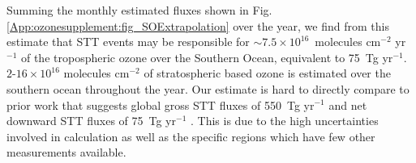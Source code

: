   Summing the monthly estimated fluxes shown in Fig. \ref{App:ozonesupplement:fig_SOExtrapolation} over the year, we find from this estimate that STT events may be responsible for $\sim 7.5 \times10^{16}$~molecules cm$^{-2}$ yr$^{-1}$ of the tropospheric ozone over the Southern Ocean, equivalent to 75~Tg yr$^{-1}$.
  $2$-$16 \times 10^{16}$ molecules cm$^{-2}$ of stratospheric based ozone is estimated over the southern ocean throughout the year.
  Our estimate is hard to directly compare to prior work that suggests global gross STT fluxes of 550~Tg yr$^{-1}$ \parencite{Stevenson2006} and net downward STT fluxes of 75~Tg yr$^{-1}$ \parencite{Sprenger2003}.
  This is due to the high uncertainties involved in calculation as well as the specific regions which have few other measurements available.
  
